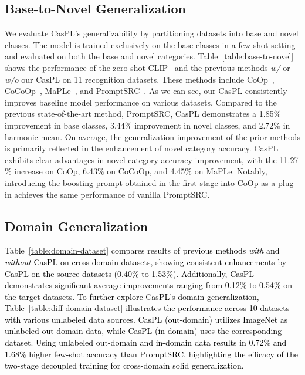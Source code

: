 \documentclass[runningheads]{llncs}
\newcommand{\rewrite}[1]{\textcolor{black}{#1}}%
\begin{document}
{{\subsection{Base-to-Novel Generalization}
We evaluate CasPL's generalizability by partitioning datasets into base and novel classes. The model is trained exclusively on the base classes in a few-shot setting and evaluated on both the base and novel categories.
Table~\ref{table:base-to-novel} shows the performance of the zero-shot CLIP~\cite{radford2021learning} and the previous methods \textit{w/} or \textit{w/o} our CasPL on 11 recognition datasets. These methods include CoOp~\cite{zhou2022learning}, CoCoOp~\cite{zhou2022conditional},  MaPLe~\cite{khattak2023maple}, and PromptSRC~\cite{khattak2023self}. As we can see, our CasPL consistently improves baseline model performance on various datasets. Compared to the previous state-of-the-art method, PromptSRC, CasPL demonstrates a 1.85$\%$ improvement in base classes, 3.44$\%$ improvement in novel classes, and 2.72$\%$ in harmonic mean. On average, the generalization improvement of the prior methods is primarily reflected in the enhancement of novel category accuracy. CasPL exhibits clear advantages in novel category accuracy improvement, with the 11.27$\%$ increase on CoOp, 6.43$\%$ on CoCoOp, and 4.45$\%$ on MaPLe. Notably, introducing the boosting prompt obtained in the first stage into CoOp as a plug-in achieves the same performance of vanilla PromptSRC.


\subsection{Domain Generalization}
\rewrite{Table~\ref{table:domain-dataset} compares results of previous methods \textit{with} and \textit{without} CasPL on cross-domain datasets, showing consistent enhancements by CasPL on the source datasets (0.40\% to 1.53\%). Additionally, CasPL demonstrates significant average improvements ranging from 0.12\% to 0.54\% on the target datasets. To further explore CasPL's domain generalization, Table~\ref{table:diff-domain-dataset} illustrates the performance across 10 datasets with various unlabeled data sources. CasPL (out-domain) utilizes ImageNet as unlabeled out-domain data, while CasPL (in-domain) uses the corresponding dataset. Using unlabeled out-domain and in-domain data results in 0.72\% and 1.68\% higher few-shot accuracy than PromptSRC, highlighting the efficacy of the two-stage decoupled training for cross-domain solid generalization.}


}}
\end{document}
